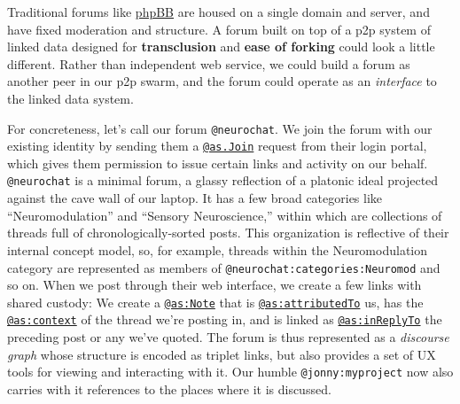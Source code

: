 \documentclass[10pt]{tufte-book}
\begin{document}
Traditional forums like \href{https://www.phpbb.com/}{phpBB} are housed
on a single domain and server, and have fixed moderation and structure.
A forum built on top of a p2p system of linked data designed for
\textbf{transclusion} and \textbf{ease of forking} could look a little
different. Rather than independent web service, we could build a forum
as another peer in our p2p swarm, and the forum could operate as an
\emph{interface} to the linked data system.

For concreteness, let's call our forum \texttt{@neurochat}. We join the
forum with our existing identity by sending them a
\href{https://www.w3.org/TR/activitystreams-vocabulary/\#dfn-join}{\texttt{@as.Join}}
request from their login portal, which gives them permission to issue
certain links and activity on our behalf. \texttt{@neurochat} is a
minimal forum, a glassy reflection of a platonic ideal projected against
the cave wall of our laptop. It has a few broad categories like
``Neuromodulation'' and ``Sensory Neuroscience,'' within which are
collections of threads full of chronologically-sorted posts. This
organization is reflective of their internal concept model, so, for
example, threads within the Neuromodulation category are represented as
members of \texttt{@neurochat:categories:Neuromod} and so on. When we
post through their web interface, we create a few links with shared
custody: We create a
\href{https://www.w3.org/TR/activitystreams-vocabulary/\#dfn-note}{\texttt{@as:Note}}
that is
\href{https://www.w3.org/TR/activitystreams-vocabulary/\#dfn-attributedto}{\texttt{@as:attributedTo}}
us, has the
\href{https://www.w3.org/TR/activitystreams-vocabulary/\#dfn-context}{\texttt{@as:context}}
of the thread we're posting in, and is linked as
\href{https://www.w3.org/TR/activitystreams-vocabulary/\#dfn-inreplyto}{\texttt{@as:inReplyTo}}
the preceding post or any we've quoted. The forum is thus represented as
a \emph{discourse graph} whose structure is encoded as triplet links,
but also provides a set of UX tools for viewing and interacting with it.
Our humble \texttt{@jonny:myproject} now also carries with it references
to the places where it is discussed.
\end{document}
